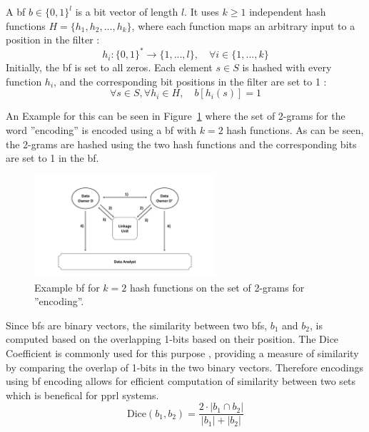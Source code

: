 A \ac{bf} $b \in \{0,1\}^l$ is a bit vector of length $l$.
It uses $k \geq 1$ independent hash functions $H = \{h_1, h_2, ..., h_k\}$, where each function maps an arbitrary input to a position in the filter \cite{schaefer2024,schnell2009privacy}:
\begin{equation}
  h_i: \{0,1\}^* \to \{1, ..., l\}, \quad \forall i \in \{1, ..., k\}
\end{equation}
Initially, the \ac{bf} is set to all zeros.
Each element $s \in S$ is hashed with every function $h_i$, and the corresponding bit positions in the filter are set to 1 \cite{schaefer2024,schnell2009privacy}:
\begin{equation}
  \forall s \in S, \forall h_i \in H, \quad b[h_i(s)] = 1
\end{equation}

An Example for this can be seen in Figure~\ref{fig:bfexample} where the set of 2-grams for the word ''encoding'' is encoded using a \ac{bf} with $k = 2$ hash functions. As can be seen, the 2-grams are hashed using the two hash functions and the corresponding bits are set to 1 in the \ac{bf}.

\begin{figure}[H]
  \centering
  \includegraphics[width=0.6\textwidth, page=5]{img/visualization.pdf}
  \caption{Example \ac{bf} for $k = 2$ hash functions on the set of 2-grams for ''encoding''.}
  \label{fig:bfexample}
\end{figure}

Since \ac{bf}s are binary vectors, the similarity between two \ac{bf}s, \(b_1\) and \(b_2\), is computed based on the overlapping 1-bits based on their position.
The Dice Coefficient is commonly used for this purpose \cite{schaefer2024}, providing a measure of similarity by comparing the overlap of 1-bits in the two binary vectors.
Therefore encodings using \ac{bf} encoding allows for efficient computation of similarity between two sets which is benefical for \ac{pprl} systems.
\begin{equation}
  \text{Dice}(b_1, b_2) = \frac{2 \cdot |b_1 \cap b_2|}{|b_1| + |b_2|}
\end{equation}

